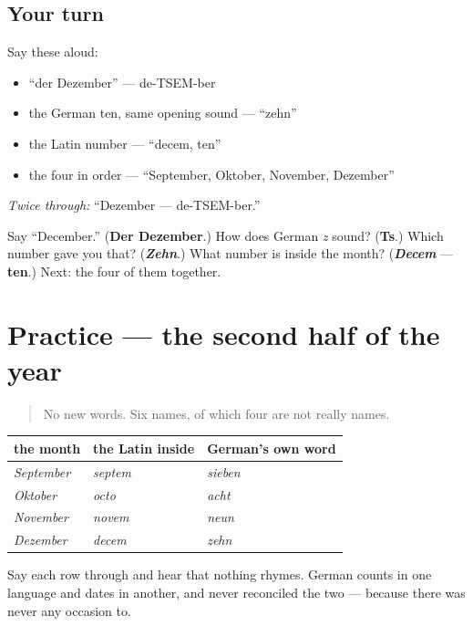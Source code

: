 \subsection*{Your turn}
Say these aloud:

\begin{itemize}
\raggedright
  \item \textquotedblleft{}der Dezember\textquotedblright{} — de-TSEM-ber
  \item the German ten, same opening sound — \textquotedblleft{}zehn\textquotedblright{}
  \item the Latin number — \textquotedblleft{}decem, ten\textquotedblright{}
  \item the four in order — \textquotedblleft{}September, Oktober, November, Dezember\textquotedblright{}
\end{itemize}

\emph{Twice through:} \textquotedblleft{}Dezember — de-TSEM-ber.\textquotedblright{}

\begin{tcolorbox}[breakable,colback=teal!4,colframe=teal!35!black,title={Before you move on}]
Say \textquotedblleft{}December.\textquotedblright{} (\textbf{Der Dezember}.) How does German \emph{z} sound? (\textbf{Ts}.) Which number gave you that? (\emph{\textbf{Zehn}}.) What number is inside the month? (\emph{\textbf{Decem}} — \textbf{ten}.) Next: the four of them together.
\end{tcolorbox}
\section[Practice]{Practice — the second half of the year}

\label{lesson:GE-C09-zahlmonate}



\begin{quote}
No new words. Six names, of which four are not really names.
\end{quote}

\begin{grammarlens}[title={Grammar Lens: the four that count in Latin}]
\noindent
\begin{tabularx}{\linewidth}{@{}>{\raggedright\arraybackslash}X>{\raggedright\arraybackslash}X>{\raggedright\arraybackslash}X@{}}
\toprule
\textbf{the month} & \textbf{the Latin inside} & \textbf{German's own word} \\
\midrule
\emph{September} & \emph{septem} & \emph{sieben} \\
\emph{Oktober} & \emph{octo} & \emph{acht} \\
\emph{November} & \emph{novem} & \emph{neun} \\
\emph{Dezember} & \emph{decem} & \emph{zehn} \\
\bottomrule
\end{tabularx}

Say each row through and hear that nothing rhymes. German counts in one language and dates in another, and never reconciled the two — because there was never any occasion to.
\end{grammarlens}


